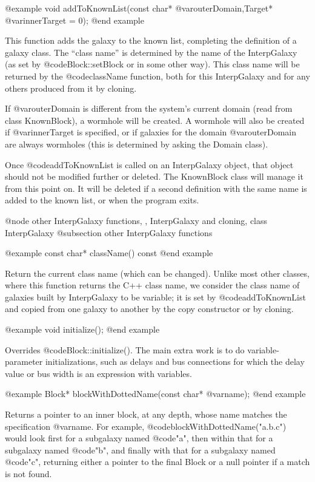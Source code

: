 @example
void addToKnownList(const char* @var{outerDomain},Target* @var{innerTarget} = 0);
@end example

This function adds the galaxy to the known list, completing the
definition of a galaxy class.  The ``class name'' is determined by
the name of the InterpGalaxy (as set by @code{Block::setBlock} or
in some other way).  This class name will be returned by the
@code{className} function, both for this InterpGalaxy and for any
others produced from it by cloning.

If @var{outerDomain} is different from the system's current domain (read
from class KnownBlock), a wormhole will be created.  A wormhole will
also be created if @var{innerTarget} is specified, or if galaxies for
the domain @var{outerDomain} are always wormholes (this is determined by
asking the Domain class).

Once @code{addToKnownList} is called on an InterpGalaxy object,
that object should not be modified further or deleted.  The KnownBlock
class will manage it from this point on.  It will be deleted if a second
definition with the same name is added to the known list, or when the
program exits.


@node other InterpGalaxy functions,  , InterpGalaxy and cloning, class InterpGalaxy
@subsection other InterpGalaxy functions

@example
const char* className() const
@end example

Return the current class name (which can be changed).  Unlike most
other classes, where this function returns the C++ class name, we
consider the class name of galaxies built by InterpGalaxy to be
variable; it is set by @code{addToKnownList} and copied from one
galaxy to another by the copy constructor or by cloning.

@example
void initialize();
@end example

Overrides @code{Block::initialize()}.  The main extra work is to do
variable-parameter initializations, such as delays and bus connections
for which the delay value or bus width is an expression with variables.

@example
Block* blockWithDottedName(const char* @var{name});
@end example

Returns a pointer to an inner block, at any depth, whose name matches
the specification @var{name}.  For example, @code{blockWithDottedName("a.b.c")}
would look first for a subgalaxy named @code{"a"}, then within that
for a subgalaxy named @code{"b"}, and finally with that for a subgalaxy
named @code{"c"}, returning either a pointer to the final Block or a
null pointer if a match is not found.

